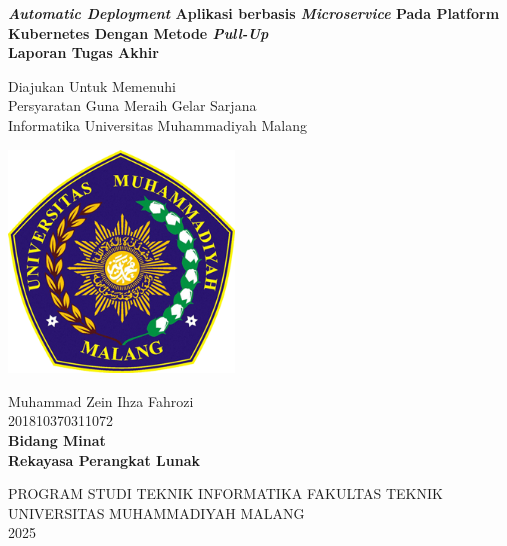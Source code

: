 \begin{titlepage}
    \begin{center}
        \onehalfspacing
        \large \bfseries \textit{Automatic Deployment}  Aplikasi berbasis \textit{Microservice} Pada Platform Kubernetes Dengan Metode \textit{Pull-Up} \\
        \vspace{1cm}
        \large Laporan Tugas Akhir \\
        \vspace{0.5cm}

        {\small \normalfont Diajukan Untuk Memenuhi\\
            Persyaratan Guna Meraih Gelar Sarjana\\
            Informatika Universitas Muhammadiyah Malang}
        \vspace{2cm}

        \includegraphics[width=6cm]{figures/logo_umm.png}

        \vspace{1cm}
        \normalfont \normalsize Muhammad Zein Ihza Fahrozi \\
        \normalfont \normalsize 201810370311072 \\

        \vspace{1cm}
        \bfseries \normalsize Bidang Minat \\
        \normalfont \normalsize Rekayasa Perangkat Lunak

        \vspace{2.5cm}

        \normalsize PROGRAM STUDI TEKNIK INFORMATIKA FAKULTAS TEKNIK \\
        UNIVERSITAS MUHAMMADIYAH MALANG \\
        2025



    \end{center}

\end{titlepage}

\newpage

